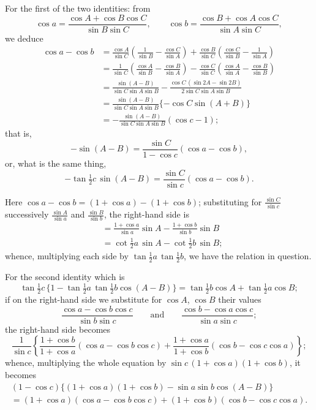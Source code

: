 \documentclass[11pt,a4paper]{book}
\begin{document}
For the first of the two identities: from
\[
\cos a = \frac{\cos A + \cos B\cos C}{\sin B\sin C},\qquad
\cos b = \frac{\cos B + \cos A\cos C}{\sin A\sin C},
\]
we deduce
\begin{align*}
\cos a - \cos b
&= \frac{\cos A}{\sin C}\left(\frac{1}{\sin B}-\frac{\cos C}{\sin A}\right)
+ \frac{\cos B}{\sin C}\left(\frac{\cos C}{\sin B}-\frac{1}{\sin A}\right)\\
&= \frac{1}{\sin C}
\left(\frac{\cos A}{\sin B}-\frac{\cos B}{\sin A}\right)
- \frac{\cos C}{\sin C}
\left(\frac{\cos A}{\sin A}-\frac{\cos B}{\sin B}\right)\\
&= \frac{\sin(A-B)}{\sin C\sin A\sin B}
- \frac{\cos C\,(\sin 2A - \sin 2B)}{2\sin C\sin A\sin B}\\
&= \frac{\sin(A-B)}{\sin C\sin A\sin B}
\{-\cos C\sin(A+B)\}\\
&= -\frac{\sin(A-B)}{\sin C\sin A\sin B}(\cos c - 1);
\end{align*}
that is,
\[
-\sin(A-B) = \frac{\sin C}{1-\cos c}(\cos a - \cos b),
\]
or, what is the same thing,
\[
-\tan\tfrac{1}{2}c\,\sin(A-B) = \frac{\sin C}{\sin c}(\cos a - \cos b).
\]

Here $\cos a - \cos b = (1+\cos a) - (1+\cos b)$; substituting for
$\frac{\sin C}{\sin c}$ successively $\frac{\sin A}{\sin a}$ and $\frac{\sin B}{\sin b}$, the right-hand side is
\begin{align*}
&= \frac{1+\cos a}{\sin a}\sin A - \frac{1+\cos b}{\sin b}\sin B\\
&= \cot\tfrac{1}{2}a\,\sin A - \cot\tfrac{1}{2}b\,\sin B;
\end{align*}
whence, multiplying each side by $\tan\tfrac{1}{2}a\,\tan\tfrac{1}{2}b$, we have the
relation in question.

For the second identity which is
\[
\tan\tfrac{1}{2}c\,\{1-\tan\tfrac{1}{2}a\,\tan\tfrac{1}{2}b\cos(A-B)\}
= \tan\tfrac{1}{2}b\cos A + \tan\tfrac{1}{2}a\cos B;
\]
if on the right-hand side we substitute for $\cos A$, $\cos B$ their values
\[
\frac{\cos a - \cos b\cos c}{\sin b\sin c}\qquad\text{and}\qquad
\frac{\cos b - \cos a\cos c}{\sin a\sin c};
\]
the right-hand side becomes
\[
\frac{1}{\sin c}
\left\{\frac{1+\cos b}{1+\cos a}(\cos a - \cos b\cos c)
+ \frac{1+\cos a}{1+\cos b}(\cos b - \cos c\cos a)\right\};
\]
whence, multiplying the whole equation by
$\sin c\,(1+\cos a)(1+\cos b)$, it becomes
\begin{multline*}
(1-\cos c)\{(1+\cos a)(1+\cos b) - \sin a\sin b\cos(A-B)\}\\
= (1+\cos a)(\cos a - \cos b\cos c) + (1+\cos b)(\cos b - \cos c\cos a).
\end{multline*}
\end{document}
